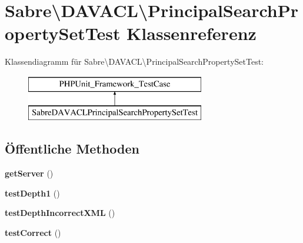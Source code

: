 \hypertarget{class_sabre_1_1_d_a_v_a_c_l_1_1_principal_search_property_set_test}{}\section{Sabre\textbackslash{}D\+A\+V\+A\+CL\textbackslash{}Principal\+Search\+Property\+Set\+Test Klassenreferenz}
\label{class_sabre_1_1_d_a_v_a_c_l_1_1_principal_search_property_set_test}
Klassendiagramm für Sabre\textbackslash{}D\+A\+V\+A\+CL\textbackslash{}Principal\+Search\+Property\+Set\+Test\+:\begin{figure}[H]
\begin{center}
\leavevmode
\includegraphics[height=2.000000cm]{class_sabre_1_1_d_a_v_a_c_l_1_1_principal_search_property_set_test}
\end{center}
\end{figure}
\subsection*{Öffentliche Methoden}
\begin{DoxyCompactItemize}
\item 
\mbox{\label{class_sabre_1_1_d_a_v_a_c_l_1_1_principal_search_property_set_test_aad19d799b4426e1c2150132928924b6d}} 
{\bfseries get\+Server} ()
\item 
\mbox{\label{class_sabre_1_1_d_a_v_a_c_l_1_1_principal_search_property_set_test_a471575528ee9a89af4c57581ee7bcbbf}} 
{\bfseries test\+Depth1} ()
\item 
\mbox{\label{class_sabre_1_1_d_a_v_a_c_l_1_1_principal_search_property_set_test_a812b210092601efc9a07dfa5e9025903}} 
{\bfseries test\+Depth\+Incorrect\+X\+ML} ()
\item 
\mbox{\label{class_sabre_1_1_d_a_v_a_c_l_1_1_principal_search_property_set_test_a6a6f25b7ff519b0479b496c2694c5aca}} 
{\bfseries test\+Correct} ()
\end{DoxyCompactItemize}



